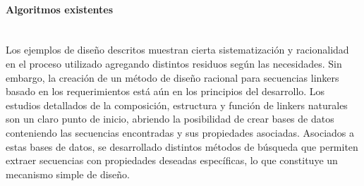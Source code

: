 







\paragraph{Algoritmos existentes} \hspace{0pt} \\ \indent 
% 
% 
Los ejemplos de diseño descritos muestran cierta sistematización y racionalidad en el proceso utilizado agregando distintos residuos según las necesidades. Sin embargo, 
la creación de un método de diseño racional para secuencias linkers basado en los requerimientos está aún en los principios del desarrollo. 
Los estudios detallados de la composición, estructura y función de linkers naturales son un claro punto de inicio, 
abriendo la posibilidad de crear bases de datos conteniendo las secuencias encontradas y sus propiedades asociadas.
Asociados a estas bases de datos, se desarrollado distintos métodos de búsqueda que permiten extraer secuencias con propiedades deseadas específicas, lo que constituye un mecanismo simple de diseño.



